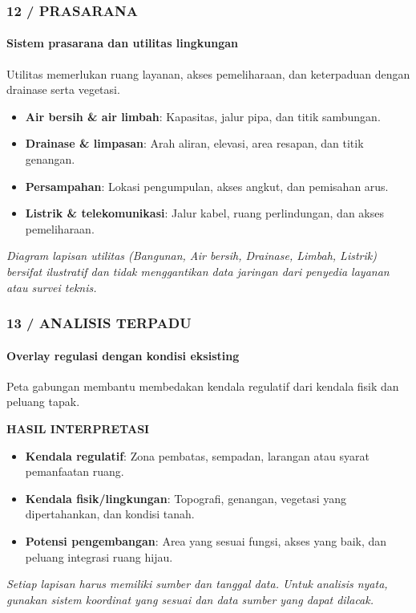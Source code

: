 \documentclass[../main.tex]{subfiles}
\begin{document}
\begin{frame}[mytitle=standard,t,mycolor=digiPH_gray!20]
	\frametitle{12 / PRASARANA}
	\framesubtitle{Sistem prasarana dan utilitas lingkungan}

	Utilitas memerlukan ruang layanan, akses pemeliharaan, dan keterpaduan dengan drainase serta vegetasi.

	\begin{itemize}
		\item \textbf{Air bersih \& air limbah}: Kapasitas, jalur pipa, dan titik sambungan.
		\item \textbf{Drainase \& limpasan}: Arah aliran, elevasi, area resapan, dan titik genangan.
		\item \textbf{Persampahan}: Lokasi pengumpulan, akses angkut, dan pemisahan arus.
		\item \textbf{Listrik \& telekomunikasi}: Jalur kabel, ruang perlindungan, dan akses pemeliharaan.
	\end{itemize}

	\vfill
	\footnotesize\textit{Diagram lapisan utilitas (Bangunan, Air bersih, Drainase, Limbah, Listrik) bersifat ilustratif dan tidak menggantikan data jaringan dari penyedia layanan atau survei teknis.}
\end{frame}

\begin{frame}[mytitle=standard,t]
	\frametitle{13 / ANALISIS TERPADU}
	\framesubtitle{Overlay regulasi dengan kondisi eksisting}

	Peta gabungan membantu membedakan kendala regulatif dari kendala fisik dan peluang tapak.

	\vspace{0.3cm}
	\textbf{HASIL INTERPRETASI}
	\begin{itemize}
		\item \textbf{Kendala regulatif}: Zona pembatas, sempadan, larangan atau syarat pemanfaatan ruang.
		\item \textbf{Kendala fisik/lingkungan}: Topografi, genangan, vegetasi yang dipertahankan, dan kondisi tanah.
		\item \textbf{Potensi pengembangan}: Area yang sesuai fungsi, akses yang baik, dan peluang integrasi ruang hijau.
	\end{itemize}

	\vfill
	\footnotesize\textit{Setiap lapisan harus memiliki sumber dan tanggal data. Untuk analisis nyata, gunakan sistem koordinat yang sesuai dan data sumber yang dapat dilacak.}
\end{frame}
\end{document}
